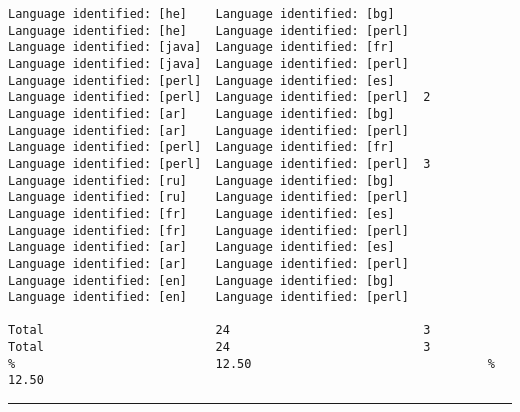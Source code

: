 \begin{verbatim}
Language identified: [he]    Language identified: [bg]             Language identified: [he]    Language identified: [perl]
Language identified: [java]  Language identified: [fr]             Language identified: [java]  Language identified: [perl]
Language identified: [perl]  Language identified: [es]             Language identified: [perl]  Language identified: [perl]  2
Language identified: [ar]    Language identified: [bg]             Language identified: [ar]    Language identified: [perl]
Language identified: [perl]  Language identified: [fr]             Language identified: [perl]  Language identified: [perl]  3
Language identified: [ru]    Language identified: [bg]             Language identified: [ru]    Language identified: [perl]
Language identified: [fr]    Language identified: [es]             Language identified: [fr]    Language identified: [perl]
Language identified: [ar]    Language identified: [es]             Language identified: [ar]    Language identified: [perl]
Language identified: [en]    Language identified: [bg]             Language identified: [en]    Language identified: [perl]

Total                        24                           3        Total                        24                           3
%                            12.50                                 %                            12.50
\end{verbatim}
\vskip4pt\hrule


